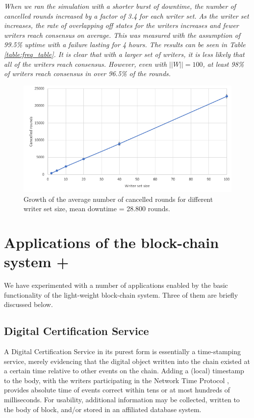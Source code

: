\documentclass[10pt]{article}
\begin{document}
\emph{When we ran the simulation with a shorter burst of downtime, the number of cancelled rounds increased by a factor of 3.4 for each writer set. %
As the writer set increases, the rate of overlapping off states for the writers increases and fewer writers reach consensus on average. This was measured with the assumption of 99.5\% uptime with a failure lasting for 4 hours. The results can be seen in Table \ref{table:freq_table}. It is clear that with a larger set of writers, it is less likely that all of the writers reach consensus. However, even with $||W|| = 100$, at least 98\% of writers reach consensus in over 96.5\% of the rounds.}




\begin{figure}[]
    \centering
   \includegraphics[scale = 0.65]{images/graf.PNG}
    \caption{Growth of the average number of cancelled rounds for different writer set size, mean downtime = 28.800 rounds.}
    \label{fig:failure_rate}
\end{figure}



\section{Applications of the block-chain system +}



We have experimented with a number of applications enabled by the basic functionality of the light-weight block-chain system. Three of them are briefly discussed below.

\subsection{Digital Certification Service}
A Digital Certification Service in its purest form is essentially a time-stamping service, merely evidencing that the digital object written into the chain existed at a certain time relative to other events on the chain. Adding a (local) timestamp to the body, with the writers participating in the Network Time Protocol \cite{NTP}, provides absolute time of events correct within tens or at most hundreds of milliseconds. For usability, additional information may be collected, written to the body of block, and/or stored in an affiliated database system.
\end{document}
